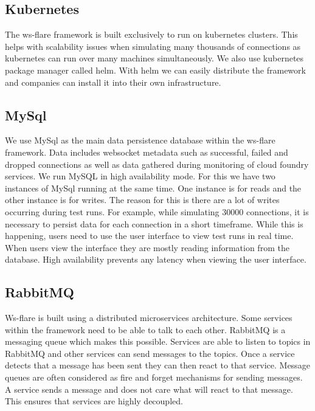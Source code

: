 \subsection{Kubernetes}

The ws-flare framework is built exclusively to run on kubernetes clusters. This helps with scalability issues when simulating many thousands of connections as kubernetes can run over many machines simultaneously. We also use kubernetes package manager called helm. With helm we can easily distribute the framework and companies can install it into their own infrastructure.

\subsection{MySql}

We use MySql as the main data persistence database within the ws-flare framework. Data includes websocket metadata such as successful, failed and dropped connections as well as data gathered during monitoring of cloud foundry services. We run MySQL in high availability mode. For this we have two instances of MySql running at the same time. One instance is for reads and the other instance is for writes. The reason for this is there are a lot of writes occurring during test runs. For example, while simulating 30000 connections, it is necessary to persist data for each connection in a short timeframe. While this is happening, users need to use the user interface to view test runs in real time. When users view the interface they are mostly reading information from the database. High availability prevents any latency when viewing the user interface.

\subsection{RabbitMQ}

Ws-flare is built using a distributed microservices architecture. Some services within the framework need to be able to talk to each other. RabbitMQ is a messaging queue which makes this possible. Services are able to listen to topics in RabbitMQ and other services can send messages to the topics. Once a service detects that a message has been sent they can then react to that service. Message queues are often considered as fire and forget mechanisms for sending messages. A service sends a message and does not care what will react to that message. This ensures that services are highly decoupled.

